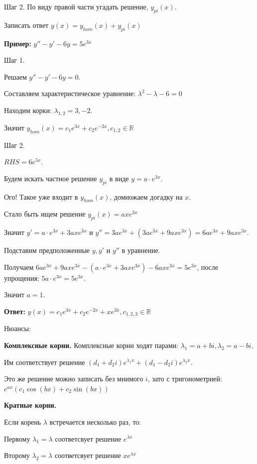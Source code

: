 \documentclass[10pt,a4paper]{article}
\begin{document}
\par Шаг 2. По виду правой части угадать решение, $y_{pi}(x).$
\par Записать ответ $y(x) = y_{hom}(x) + y_{pi}(x)$
\par \textbf{Пример:} $y'' - y' - 6y = 5e^{3x}$
\par Шаг 1.
\par Решаем $y'' - y' - 6y = 0$.
\par Составляем характеристическое уравнение: $\lambda^2 - \lambda - 6 = 0$
\par Находим корки: $\lambda_{1,2} = 3, -2$.
\par Значит $y_{hom}(x) = c_1e^{3x} + c_2e^{-2x}, c_{1,2} \in \mathbb{R}$
\par Шаг 2.
\par $RHS = 6e^{5x}.$ 
\par Будем искать частное решение $y_{pi}$ в виде $y = a \cdot e^{3x}$. 
\par Ого! Такое уже входит в $y_{hom}(x)$, домножаем догадку на $x$.
\par Стало быть ищем решение $y_{pi}(x) = axe^{3x}$
\par Значит $y' = a \cdot e^{3x} + 3axe^{3x}$ и $y'' = 3ae^{3x} + (3ae^{3x}+ 9axe^{3x}) = 6ae^{3x} + 9axe^{3x}$.
\par Подставим предположенные $y, y'$ и $y''$ в уравнение.
\par Получаем $6ae^{3x} + 9axe^{3x} - (a \cdot e^{3x} + 3axe^{3x}) - 6axe^{3x}  = 5e^{3x}$, после упрощения: $5a \cdot e^{3x} = 5e^{3x}$.
\par Значит $a = 1.$ 
\par \textbf{Ответ:} $y(x) = c_1e^{3x} + c_2e^{-2x} + xe^{3x}, c_{1, 2, 3} \in \mathbb{R}$ \\
\par Нюансы: 
\par \textbf{Комплексные корни.} Комплексные корни ходят парами: $\lambda_1 = a+ bi, \lambda_2 = a - bi$.
\par Им соответствует решение $(d_1 + d_2i)e^{\lambda_1 x} + (d_1 - d_2i)e^{\lambda_2 x}$.
\par Это же решение можно записать без мнимого $i$, зато с тригонометрией: $e^{ax}(c_1\cos(bx) + c_2\sin(bx))$
\par \textbf{Кратные корни.}
\par Если корень $\lambda$ встречается несколько раз, то:
\par Первому $\lambda_1 = \lambda$ соответсвует решение $e^{\lambda x}$
\par Второму $\lambda_2 = \lambda$ соответсвует решение $xe^{\lambda x}$
\end{document}

